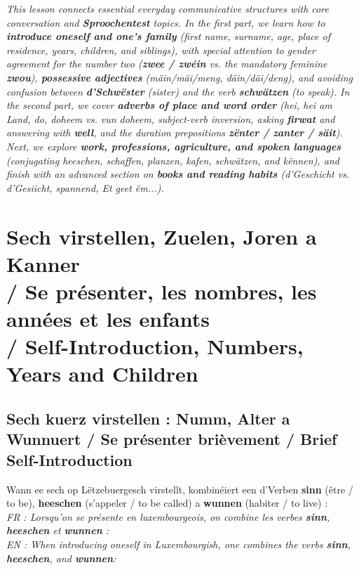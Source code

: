 \textit{This lesson connects essential everyday communicative structures with core conversation and \textbf{Sproochentest} topics. In the first part, we learn how to \textbf{introduce oneself and one's family} (first name, surname, age, place of residence, years, children, and siblings), with special attention to gender agreement for the number two (\textbf{zwee / zwéin} vs. the mandatory feminine \textbf{zwou}), \textbf{possessive adjectives} (\textit{mäin/mäi/meng}, \textit{däin/däi/deng}), and avoiding confusion between \textbf{d'Schwëster} (sister) and the verb \textbf{schwätzen} (to speak). In the second part, we cover \textbf{adverbs of place and word order} (\textit{hei}, \textit{hei am Land}, \textit{do}, \textit{doheem} vs. \textit{vun doheem}, subject-verb inversion, asking \textbf{firwat} and answering with \textbf{well}, and the duration prepositions \textbf{zënter / zanter / säit}). Next, we explore \textbf{work, professions, agriculture, and spoken languages} (conjugating \textit{heeschen}, \textit{schaffen}, \textit{planzen}, \textit{kafen}, \textit{schwätzen}, and \textit{kënnen}), and finish with an advanced section on \textbf{books and reading habits} (\textit{d'Geschicht} vs. \textit{d'Gesiicht}, \textit{spannend}, \textit{Et geet ëm...}).}

\vspace{1.5em}

\section[Sech virstellen, Zuelen, Joren a Kanner / Self-Introduction, Numbers and Children]{Sech virstellen, Zuelen, Joren a Kanner \\/ Se présenter, les nombres, les années et les enfants \\/ Self-Introduction, Numbers, Years and Children}

\subsection{Sech kuerz virstellen : Numm, Alter a Wunnuert / Se présenter brièvement / Brief Self-Introduction}

Wann ee sech op Lëtzebuergesch virstellt, kombinéiert een d'Verben \textbf{sinn} (être / to be), \textbf{heeschen} (s'appeler / to be called) a \textbf{wunnen} (habiter / to live) : \\
\textit{FR : Lorsqu'on se présente en luxembourgeois, on combine les verbes \textbf{sinn}, \textbf{heeschen} et \textbf{wunnen} :} \\
\textit{EN : When introducing oneself in Luxembourgish, one combines the verbs \textbf{sinn}, \textbf{heeschen}, and \textbf{wunnen}:}

